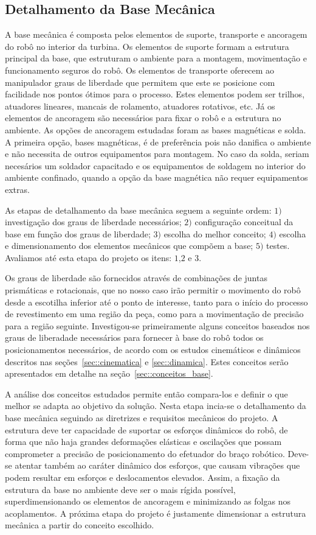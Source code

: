 \subsection{Detalhamento da Base Mecânica}\label{sec::base_mec}
A base mecânica é composta pelos elementos de suporte, transporte e ancoragem do
robô no interior da turbina. Os elementos de suporte formam a estrutura
principal da base, que estruturam o ambiente para a montagem, movimentação e
funcionamento seguros do robô. Os elementos de transporte oferecem ao
manipulador graus de liberdade que permitem que este se posicione com facilidade
nos pontos ótimos para o processo. Estes elementos podem ser trilhos, atuadores
lineares, mancais de rolamento, atuadores rotativos, etc. Já os elementos de
ancoragem são necessários para fixar o robô e a estrutura no ambiente. As
opções de ancoragem estudadas foram as bases magnéticas e solda. A
primeira opção, bases magnéticas, é de preferência pois não danifica o ambiente
e não necessita de outros equipamentos para montagem. No caso da solda,
seriam necesários um soldador capacitado e os equipamentos de soldagem no interior do
ambiente confinado, quando a opção da base magnética não requer equipamentos
extras.

As etapas de detalhamento da base mecânica seguem a seguinte ordem: $1)$
investi\-gação dos graus de liberdade necessários; $2)$ configuração conceitual 
da base em função dos graus de liberdade; $3)$ escolha do melhor conceito; $4)$ 
escolha e dimensionamento dos elementos mecânicos que compõem a base; $5)$ testes.
Avaliamos até esta etapa do projeto os itens: $1$,$2$ e $3$.

Os graus de liberdade são fornecidos através de combinações de juntas
prismáticas e rotacionais, que no nosso caso irão permitir o movimento do robô
desde a escotilha inferior até o ponto de interesse, tanto para o início do
processo de revestimento em uma região da peça, como para a movimentação de
precisão para a região seguinte.
Investigou-se primeiramente alguns conceitos baseados nos graus de liberadade 
necessários para fornecer à base do robô todos os posicionamentos necessá\-rios, 
de acordo com os estudos cinemáticos e dinâmicos descritos  nas
seções~\ref{sec::cinematica} e \ref{sec::dinamica}. Estes conceitos serão
apresentados em detalhe na seção~\ref{sec::conceitos_base}.

A análise dos conceitos estudados permite então compara-los e definir o que
melhor se adapta ao objetivo da solução. Nesta etapa incia-se o detalhamento da base
mecâ\-nica seguindo as diretrizes e requisitos mecânicos do projeto. A
estrutura deve ter capacidade de suportar os esforços dinâmicos do robô,
de forma que não haja grandes deformações elásticas e oscilações que possam
comprometer a precisão de posicionamento do efetuador do braço robótico.
Deve-se atentar também ao caráter dinâmico dos esforços, que causam vibrações
que podem resultar em esforços e deslocamentos elevados.
Assim, a fixação da estrutura da base no ambiente deve ser o mais rígida
possível, superdimensionando os elementos de ancoragem e minimizando as folgas
nos acoplamentos. A próxima etapa do projeto é justamente dimensionar a
estrutura mecânica a partir do conceito escolhido.

